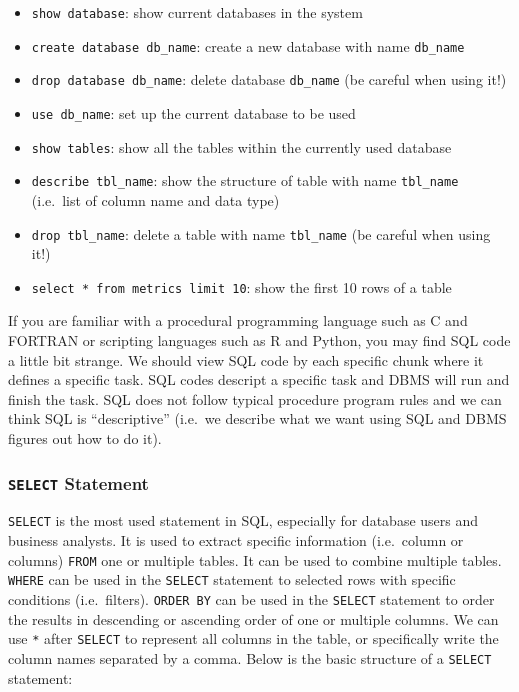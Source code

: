 \documentclass[
  12pt,
]{krantz}
\providecommand{\tightlist}{%
  \setlength{\itemsep}{0pt}\setlength{\parskip}{0pt}}
\begin{document}
\begin{itemize}
\tightlist
\item
  \texttt{show\ database}: show current databases in the system
\item
  \texttt{create\ database\ db\_name}: create a new database with name \texttt{db\_name}
\item
  \texttt{drop\ database\ db\_name}: delete database \texttt{db\_name} (be careful when using it!)
\item
  \texttt{use\ db\_name}: set up the current database to be used
\item
  \texttt{show\ tables}: show all the tables within the currently used database
\item
  \texttt{describe\ tbl\_name}: show the structure of table with name \texttt{tbl\_name} (i.e.~list of column name and data type)
\item
  \texttt{drop\ tbl\_name}: delete a table with name \texttt{tbl\_name} (be careful when using it!)
\item
  \texttt{select\ *\ from\ metrics\ limit\ 10}: show the first 10 rows of a table
\end{itemize}

If you are familiar with a procedural programming language such as C and FORTRAN or scripting languages such as R and Python, you may find SQL code a little bit strange. We should view SQL code by each specific chunk where it defines a specific task. SQL codes descript a specific task and DBMS will run and finish the task. SQL does not follow typical procedure program rules and we can think SQL is ``descriptive'' (i.e.~we describe what we want using SQL and DBMS figures out how to do it).

\hypertarget{select-statement}{%
\subsubsection{\texorpdfstring{\texttt{SELECT} Statement}{SELECT Statement}}\label{select-statement}}

\texttt{SELECT} is the most used statement in SQL, especially for database users and business analysts. It is used to extract specific information (i.e.~column or columns) \texttt{FROM} one or multiple tables. It can be used to combine multiple tables. \texttt{WHERE} can be used in the \texttt{SELECT} statement to selected rows with specific conditions (i.e.~filters). \texttt{ORDER\ BY} can be used in the \texttt{SELECT} statement to order the results in descending or ascending order of one or multiple columns. We can use \texttt{*} after \texttt{SELECT} to represent all columns in the table, or specifically write the column names separated by a comma. Below is the basic structure of a \texttt{SELECT} statement:
\end{document}
